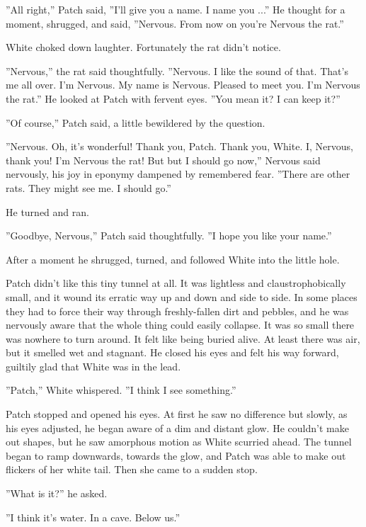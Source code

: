 \documentclass[11pt]{article}
\begin{document}
 ''All right,'' Patch said, ''I'll give you a name. I name you ...'' He thought for a moment, shrugged, and said, ''Nervous. From now on you're Nervous the rat.''\par
 White choked down laughter. Fortunately the rat didn't notice.\par
 ''Nervous,'' the rat said thoughtfully. ''Nervous. I like the sound of that. That's me all over. I'm Nervous. My name is Nervous. Pleased to meet you. I'm Nervous the rat.'' He looked at Patch with fervent eyes. ''You mean it? I can keep it?''\par
 ''Of course,'' Patch said, a little bewildered by the question.\par
 ''Nervous. Oh, it's wonderful! Thank you, Patch. Thank you, White. I, Nervous, thank you! I'm Nervous the rat! But %
 but I should go now,'' Nervous said nervously, his joy in eponymy dampened by remembered fear. ''There are other rats. They might see me. I should go.''\par
 He turned and ran.\par
 ''Goodbye, Nervous,'' Patch said thoughtfully. ''I hope you like your name.''\par
 After a moment he shrugged, turned, and followed White into the little hole.\par
 Patch didn't like this tiny tunnel at all. It was lightless and claustrophobically small, and it wound its erratic way up and down and side to side. In some places they had to force their way through freshly-fallen dirt and pebbles, and he was nervously aware that the whole thing could easily collapse. It was so small there was nowhere to turn around. It felt like being buried alive. At least there was air, but it smelled wet and stagnant. He closed his eyes and felt his way forward, guiltily glad that White was in the lead.\par
 ''Patch,'' White whispered. ''I think I see something.''\par
 Patch stopped and opened his eyes. At first he saw no difference %
 but slowly, as his eyes adjusted, he began aware of a dim and distant glow. He couldn't make out shapes, but he saw amorphous motion as White scurried ahead. The tunnel began to ramp downwards, towards the glow, and Patch was able to make out flickers of her white tail. Then she came to a sudden stop.\par
 ''What is it?'' he asked.\par
 ''I think it's water. In a cave. Below us.''\par
\end{document}
